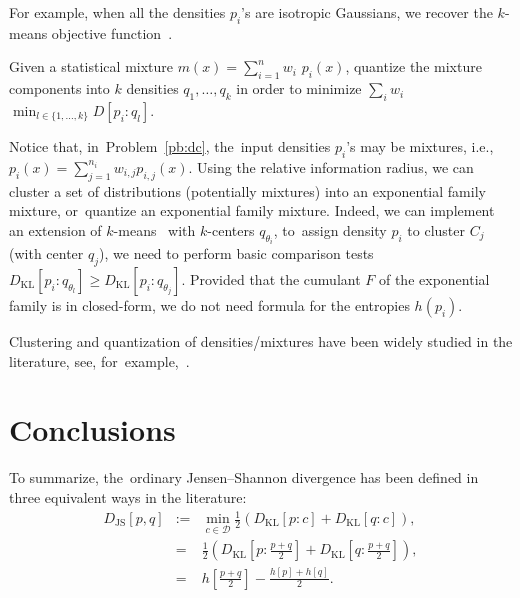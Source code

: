 \documentclass[entropy,article,accept,oneauthor,pdftex,entropy]{Definitions/mdpi}
\def\JS{\mathrm{JS}}
\def\KL{\mathrm{KL}}
\def\calD{\mathcal{D}}
\begin{document}
\begin{paracol}{2}
For example, when all the densities $p_i$'s are isotropic Gaussians, we recover the $k$-means objective function~\cite{kmeans-1982}.


\begin{Problem}\label{pb:mq}
Given a statistical mixture $m(x)=\sum_{i=1}^n w_i$ $p_i(x)$, quantize the mixture components into $k$ densities $q_1,\ldots, q_k$ in order to minimize
$\sum_i w_i $  $ \min_{l\in\{1,\ldots,k\}}D[p_i:q_l]$.
\end{Problem}

Notice that, in~Problem~\ref{pb:dc}, the~input densities $p_i$'s may be mixtures, i.e.,~$p_i(x)=\sum_{j=1}^{n_i} w_{i,j}p_{i,j}(x)$.
Using the relative information radius, we can cluster a set of distributions (potentially mixtures) into an exponential family mixture, or~quantize an exponential family mixture.
Indeed, we can implement an extension of $k$-means~\cite{kmeans-1982} with $k$-centers $q_{\theta_i}$, to~assign density $p_i$ to cluster $C_j$ (with center $q_j$), we need to perform basic comparison tests
$D_\KL[p_i:q_{\theta_l}]\geq D_\KL[p_i:q_{\theta_j}]$. 
Provided that the cumulant $F$ of the exponential family is in closed-form, we do not need formula for the entropies $h(p_i)$.

Clustering and quantization of densities/mixtures have been widely studied in the literature, see, for~example,~\cite{EntropicClusteringGaussians-2006,ClusteringGaussian-2008,QuantizationBregman-2010,SimplifyingMixtures-2010,ClusteringGMM-2013,MusicGMM-2015,ClusteringGaussian-2016}.




\section{Conclusions}\label{sec:concl}



To summarize, the~ordinary Jensen--Shannon divergence has been defined in three equivalent ways in the literature:
\begin{eqnarray}
D_\JS[p,q] &:=& \min_{c\in\calD} \frac{1}{2}\left( D_\KL[p:c]+D_\KL[q:c] \right),\label{eq:js1}\\ 
&=&  \frac{1}{2}\left(D_\KL\left[p:\frac{p+q}{2}\right]+D_\KL\left[q:\frac{p+q}{2}\right]\right),\label{eq:js2}\\ 
&=&  h\left[\frac{p+q}{2}\right] - \frac{h[p]+h[q]}{2}. \label{eq:js3}
\end{eqnarray} 


\end{paracol}
\end{document}
